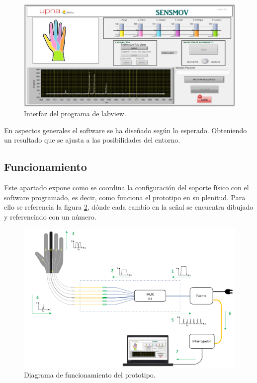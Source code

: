 \begin{itemize} [label=]
	\begin{figure}[H]
		\centering
		\includegraphics[width=1\textwidth]{./img/interfazSM}
		\caption{Interfaz del programa de labview.}
		\label{fig:interfazSM}
	\end{figure}	
	
	En aspectos generales el software se ha diseñado según lo esperado. Obteniendo un resultado que se ajusta a las posibilidades del entorno.
\end{itemize}


\subsection{Funcionamiento}
\label{sec:funcionamiento3}

Este apartado expone como se coordina la configuración del soporte físico con el software programado, es decir, como funciona el prototipo en su plenitud. Para ello se referencia la figura \ref{fig:diagramaFBGfuncionamiento}, dónde cada cambio en la señal se encuentra dibujado y referenciado con un número.

\begin{figure}[H]
	\centering
	\includegraphics[width=1\textwidth]{./img/diagramaFBGfuncionamiento}
	\caption{Diagrama de funcionamiento del prototipo.} \label{fig:diagramaFBGfuncionamiento}
\end{figure}

